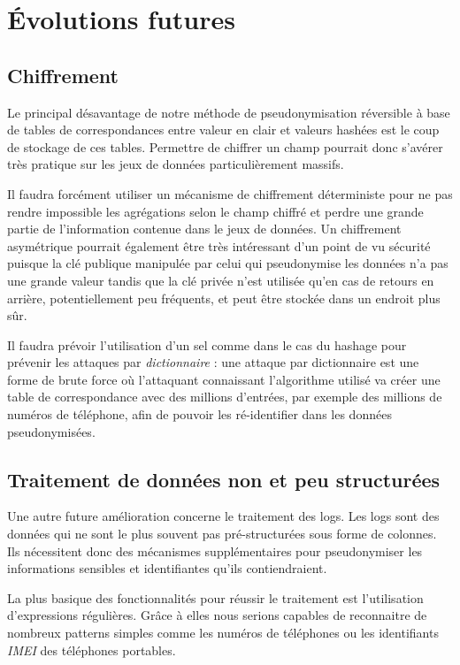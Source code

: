 \documentclass[12pt]{report}
\begin{document}
	\section{Évolutions futures}
	\subsection{Chiffrement}
	Le principal désavantage de notre méthode de pseudonymisation réversible à base de tables de correspondances entre valeur en clair et valeurs hashées est le coup de stockage de ces tables. Permettre de chiffrer un champ pourrait donc s’avérer très pratique sur les jeux de données particulièrement massifs. 
	
	Il faudra forcément utiliser un mécanisme de chiffrement déterministe pour ne pas rendre impossible les agrégations selon le champ chiffré et perdre une grande partie de l'information contenue dans le jeux de données. Un chiffrement asymétrique pourrait également être très intéressant d'un point de vu sécurité puisque la clé publique manipulée par celui qui pseudonymise les données n'a pas une grande valeur tandis que la clé privée n'est utilisée qu'en cas de retours en arrière, potentiellement peu fréquents, et peut être stockée dans un endroit plus sûr. 
	
	Il faudra prévoir l'utilisation d'un sel comme dans le cas du hashage pour prévenir les attaques par \textit{dictionnaire} : une attaque par dictionnaire est une forme de brute force où l'attaquant connaissant l'algorithme utilisé va créer une table de correspondance avec des millions d'entrées, par exemple des millions de numéros de téléphone, afin de pouvoir les ré-identifier dans les données pseudonymisées. 
	
	\subsection{Traitement de données non et peu structurées}
	Une autre future amélioration concerne le traitement des logs. Les logs sont des données qui ne sont le plus souvent pas pré-structurées sous forme de colonnes. Ils nécessitent donc des mécanismes supplémentaires pour pseudonymiser les informations sensibles et identifiantes qu'ils contiendraient. 
	
	La plus basique des fonctionnalités pour réussir le traitement est l'utilisation d'expressions régulières. Grâce à elles nous serions capables de reconnaitre de nombreux patterns simples comme les numéros de téléphones ou les identifiants \textit{IMEI} des téléphones portables.
	
\end{document}
